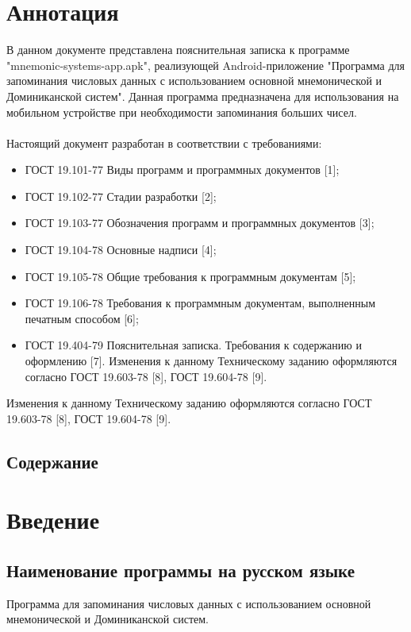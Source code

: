 \documentclass[draft]{article}
\begin{document}
\section {Аннотация}
В данном документе представлена пояснительная записка к программе "{}mnemonic-systems-app.apk"{}, реализующей Android-приложение "{}Программа для запоминания числовых данных с использованием основной мнемонической и Доминиканской систем"{}. Данная программа предназначена для использования на мобильном устройстве при необходимости запоминания больших чисел.\\
~\\
Настоящий документ разработан в соответствии с требованиями:
\begin{itemize}
    \item ГОСТ 19.101-77 Виды программ и программных документов [1];
    \item ГОСТ 19.102-77 Стадии разработки [2];
    \item ГОСТ 19.103-77 Обозначения программ и программных документов [3];
    \item ГОСТ 19.104-78 Основные надписи [4];
    \item ГОСТ 19.105-78 Общие требования к программным документам [5];
    \item ГОСТ 19.106-78 Требования к программным документам, выполненным печатным
способом [6];
    \item ГОСТ 19.404-79 Пояснительная записка. Требования к содержанию и оформлению [7].
Изменения к данному Техническому заданию оформляются согласно ГОСТ 19.603-78 [8],
ГОСТ 19.604-78 [9].
\end{itemize}
Изменения к данному Техническому заданию оформляются согласно ГОСТ 19.603-78 [8],
ГОСТ 19.604-78 [9].
\newpage
\begin{center}
\section {Содержание}
\tableofcontents
\end{center}
\newpage
\section{Введение}
\subsection{Наименование программы на русском языке}
Программа для запоминания числовых данных с использованием основной мнемонической и Доминиканской систем.
\end{document}
